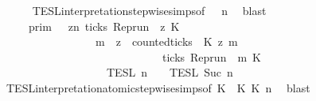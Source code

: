 \begin{isabellebody}
\ \ \ \ \isamarkupfalse%
\ TESL{\isacharunderscore}interpretation{\isacharunderscore}stepwise{\isachardot}simps{\isacharparenleft}{}{\isacharparenright}{\isacharbrackleft}of\ {\isacharunderscore}\ {\isacartoucheopen}{\isasymPsi}{\isacartoucheclose}\ {\isacartoucheopen}n{\isacartoucheclose}{\isacharbrackright}\ \isamarkupfalse%
\ blast\isanewline
\ \ \isamarkupfalse%
\ \isamarkupfalse%
\ {\isacartoucheopen}{\isachardot}{\isachardot}{\isachardot}\ {\isacharequal}\ {\isasymlbrakk}{\isasymlbrakk}\ {\isasymGamma}\ {\isasymrbrakk}{\isasymrbrakk}\isactrlsub p\isactrlsub r\isactrlsub i\isactrlsub m\ {\isasyminter}\ {\isacharbraceleft}{\isasymrho}{\isachardot}\ {\isasymforall}z{\isasymge}n{\isachardot}\ ticks\ {\isacharparenleft}{\isacharparenleft}Rep{\isacharunderscore}run\ {\isasymrho}{\isacharparenright}\ z\ K\ {\isasymlongrightarrow}\isanewline
\ \ \ \ \ \ \ \ \ \ \ \ \ \ \ \ \ {\isacharparenleft}{\isasymforall}m\ {\isasymge}\ z{\isachardot}\ \ counted{\isacharunderscore}ticks\ {\isasymrho}\ K\ z\ m\ {}\isanewline
\ \ \ \ \ \ \ \ \ \ \ \ \ \ \ \ \ \ \ \ \ \ \ \ \ \ \ \ {\isasymlongrightarrow}\ ticks\ {\isacharparenleft}{\isacharparenleft}Rep{\isacharunderscore}run\ {\isasymrho}{\isacharparenright}\ m\ K\ {\isacharbraceright}\isanewline
\ \ \ \ \ \ \ \ \ \ \ \ \ \ \ \ {\isasyminter}\ {\isasymlbrakk}{\isasymlbrakk}\ {\isasymPsi}\ {\isasymrbrakk}{\isasymrbrakk}\isactrlsub T\isactrlsub E\isactrlsub S\isactrlsub L\isactrlbsup {\isasymge}\ n\isactrlesup \ {\isasyminter}\ {\isasymlbrakk}{\isasymlbrakk}\ {\isasymPhi}\ {\isasymrbrakk}{\isasymrbrakk}\isactrlsub T\isactrlsub E\isactrlsub S\isactrlsub L\isactrlbsup {\isasymge}\ Suc\ n\isactrlesup {\isacartoucheclose}\isanewline
\ \ \ \ \isamarkupfalse%
\ TESL{\isacharunderscore}interpretation{\isacharunderscore}atomic{\isacharunderscore}stepwise{\isachardot}simps{\isacharparenleft}{}{}{\isacharparenright}{\isacharbrackleft}of\ {\isacartoucheopen}K\ {\isacartoucheopen}{}{\isacartoucheclose}\ {\isacartoucheopen}K\ {\isacartoucheopen}K\ {\isacartoucheopen}n{\isacartoucheclose}{\isacharbrackright}\ \isamarkupfalse%
\ blast\isanewline
\ \ \isamarkupfalse%
\ \isamarkupfalse%

\end{isabellebody}

